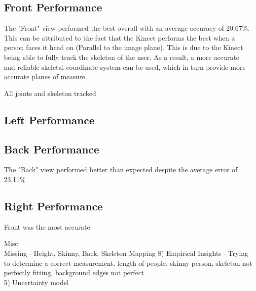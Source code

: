 \subsection{Front Performance}

The "Front" view performed the best overall with an average accuracy of 20.67\%. This can be attributed to the fact that the Kinect performs the best when a person faces it head on (Parallel to the image plane). This is due to the Kinect being able to fully track the skeleton of the user. As a result, a more accurate and reliable skeletal coordinate system can be used, which in turn provide more accurate planes of measure. 

All joints and skeleton tracked 

\subsection{Left Performance}

\subsection{Back Performance}

The "Back" view performed better than expected despite the average error of 23.11\%

\subsection{Right Performance}

Front was the most accurate

Misc\\
Missing - Height, Skinny, Back, Skeleton Mapping
8) Empirical Insights - Trying to determine a correct measurement,  length of people, skinny person, skeleton not perfectly fitting, background edges not perfect \\

5) Uncertainty model\\

\fi